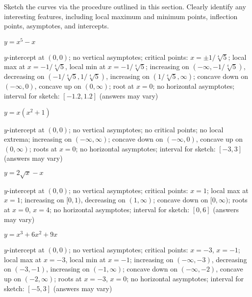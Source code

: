  
\begin{exercises}

\noindent Sketch the curves via the procedure outlined in this
section. Clearly identify any interesting features, including local
maximum and minimum points, inflection points, asymptotes, and
intercepts.

\twocol


\begin{exercise} $y= x^5 - x$
\begin{answer}
$y$-intercept at $(0,0)$; no vertical asymptotes; critical points:
  $x=\pm1/\sqrt[4]{5}$; local max at $x=-1/\sqrt[4]{5}$, local min at
  $x=-1/\sqrt[4]{5}$; increasing on $(-\infty,-1/\sqrt[4]{5})$, decreasing
  on $(-1/\sqrt[4]{5},1/\sqrt[4]{5})$, increasing on
  $(1/\sqrt[4]{5},\infty)$; concave down on $(-\infty,0)$, concave up on
  $(0, \infty)$; root at $x=0$; no horizontal asymptotes; interval for
  sketch: $[-1.2,1.2]$ (answers may vary)
\end{answer}
\end{exercise}

\begin{exercise} $y=x(x^2+1)$
\begin{answer}
$y$-intercept at $(0,0)$; no vertical asymptotes; no critical points;
  no local extrema; increasing on $(-\infty,\infty)$; concave down on
  $(-\infty,0)$, concave up on $(0, \infty)$; roots at $x=0$; no
  horizontal asymptotes; interval for sketch: $[-3,3]$ (answers may
  vary)
\end{answer}
\end{exercise}

\begin{exercise} $y=2\sqrt{x} - x$
\begin{answer}
$y$-intercept at $(0,0)$; no vertical asymptotes; critical points: $x=
  1$; local max at $x=1$; increasing on $[0,1)$, decreasing on
    $(1,\infty)$; concave down on $[0,\infty)$; roots at $x=0$, $x=4$;
      no horizontal asymptotes; interval for sketch: $[0,6]$ (answers
      may vary)
\end{answer}
\end{exercise}

\begin{exercise} $y=x^3+6x^2 + 9x$
\begin{answer}
$y$-intercept at $(0,0)$; no vertical asymptotes; critical points:
  $x=-3$, $x= -1$; local max at $x=-3$, local min at $x=-1$;
  increasing on $(-\infty,-3)$, decreasing on $(-3,-1)$, increasing on
  $(-1,\infty)$; concave down on $(-\infty,-2)$, concave up on $(-2,
  \infty)$; roots at $x=-3$, $x=0$; no horizontal asymptotes; interval
  for sketch: $[-5,3]$ (answers may vary)
\end{answer}
\end{exercise}


\end{exercises}
